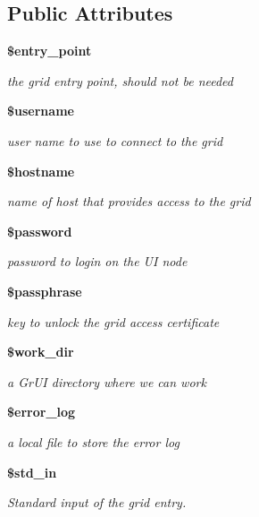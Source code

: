 \subsection*{Public Attributes}
\begin{CompactItemize}
\item 
{\bf \$entry\_\-point}
\begin{CompactList}\small\item\em the grid entry point, should not be needed \item\end{CompactList}\item 
{\bf \$username}
\begin{CompactList}\small\item\em user name to use to connect to the grid \item\end{CompactList}\item 
{\bf \$hostname}
\begin{CompactList}\small\item\em name of host that provides access to the grid \item\end{CompactList}\item 
{\bf \$password}
\begin{CompactList}\small\item\em password to login on the UI node \item\end{CompactList}\item 
{\bf \$passphrase}
\begin{CompactList}\small\item\em key to unlock the grid access certificate \item\end{CompactList}\item 
{\bf \$work\_\-dir}
\begin{CompactList}\small\item\em a Gr\-UI directory where we can work \item\end{CompactList}\item 
{\bf \$error\_\-log}
\begin{CompactList}\small\item\em a local file to store the error log \item\end{CompactList}\item 
{\bf \$std\_\-in}
\begin{CompactList}\small\item\em Standard input of the grid entry. \item\end{CompactList}\item 

\end{CompactItemize}
